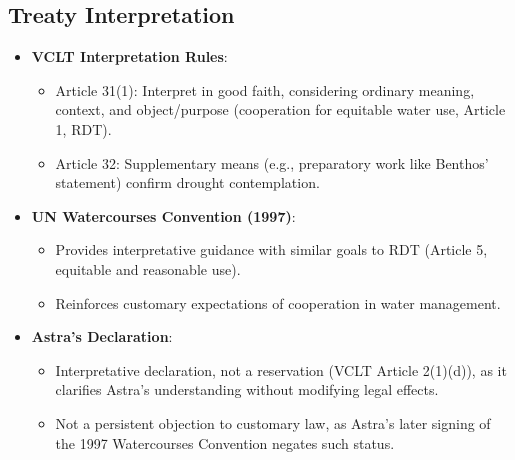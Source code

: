 \subsection{Treaty Interpretation}
\begin{itemize}
    \item \textbf{VCLT Interpretation Rules}:
    \begin{itemize}
        \item Article 31(1): Interpret in good faith, considering ordinary meaning, context, and object/purpose (cooperation for equitable water use, Article 1, RDT).
        \item Article 32: Supplementary means (e.g., preparatory work like Benthos’ statement) confirm drought contemplation.
    \end{itemize}
    \item \textbf{UN Watercourses Convention (1997)}:
    \begin{itemize}
        \item Provides interpretative guidance with similar goals to RDT (Article 5, equitable and reasonable use).
        \item Reinforces customary expectations of cooperation in water management.
    \end{itemize}
    \item \textbf{Astra’s Declaration}:
    \begin{itemize}
        \item Interpretative declaration, not a reservation (VCLT Article 2(1)(d)), as it clarifies Astra’s understanding without modifying legal effects.
        \item Not a persistent objection to customary law, as Astra’s later signing of the 1997 Watercourses Convention negates such status.
    \end{itemize}
\end{itemize}

